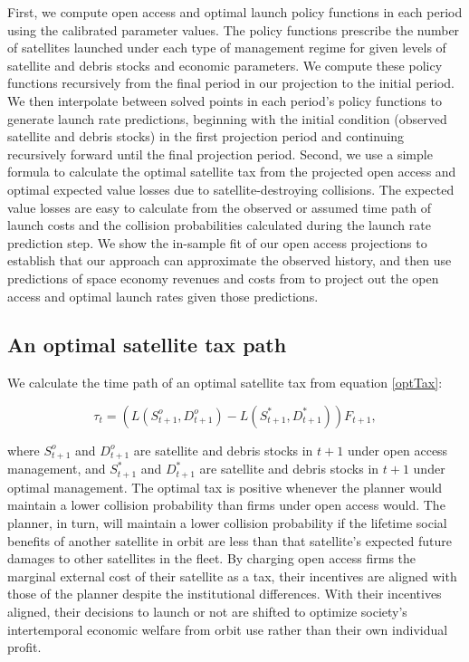 \documentclass[12pt]{article}
\begin{document}
First, we compute open access and optimal launch policy functions in each period using the calibrated parameter values. The policy functions prescribe the number of satellites launched under each type of management regime for given levels of satellite and debris stocks and economic parameters. We compute these policy functions recursively from the final period in our projection to the initial period. We then interpolate between solved points in each period's policy functions to generate launch rate predictions, beginning with the initial condition (observed satellite and debris stocks) in the first projection period and continuing recursively forward until the final projection period. Second, we use a simple formula to calculate the optimal satellite tax from the projected open access and optimal expected value losses due to satellite-destroying collisions. The expected value losses are easy to calculate from the observed or assumed time path of launch costs and the collision probabilities calculated during the launch rate prediction step. We show the in-sample fit of our open access projections to establish that our approach can approximate the observed history, and then use predictions of space economy revenues and costs from \citep{MSreport} to project out the open access and optimal launch rates given those predictions. 

\subsection{An optimal satellite tax path}

We calculate the time path of an optimal satellite tax from equation \ref{optTax}:

\begin{equation}
\label{optTax}
\tau_t = (L(S^o_{t+1},D^o_{t+1}) - L(S^*_{t+1},D^*_{t+1}))F_{t+1},
\end{equation}

where $S^o_{t+1}$ and $D^o_{t+1}$ are satellite and debris stocks in $t+1$ under open access management, and $S^*_{t+1}$ and $D^*_{t+1}$ are satellite and debris stocks in $t+1$ under optimal management. The optimal tax is positive whenever the planner would maintain a lower collision probability than firms under open access would. The planner, in turn, will maintain a lower collision probability if the lifetime social benefits of another satellite in orbit are less than that satellite's expected future damages to other satellites in the fleet. By charging open access firms the marginal external cost of their satellite as a tax, their incentives are aligned with those of the planner despite the institutional differences. With their incentives aligned, their decisions to launch or not are shifted to optimize society's intertemporal economic welfare from orbit use rather than their own individual profit. \\
\end{document}
